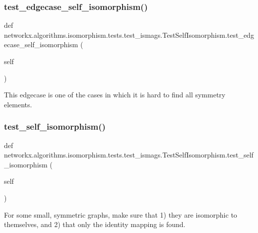 \subsubsection{\texorpdfstring{test\+\_\+edgecase\+\_\+self\+\_\+isomorphism()}{test\_edgecase\_self\_isomorphism()}}
{\footnotesize\ttfamily def networkx.\+algorithms.\+isomorphism.\+tests.\+test\+\_\+ismags.\+Test\+Self\+Isomorphism.\+test\+\_\+edgecase\+\_\+self\+\_\+isomorphism (\begin{DoxyParamCaption}\item[{}]{self }\end{DoxyParamCaption})}

\begin{DoxyVerb}This edgecase is one of the cases in which it is hard to find all
symmetry elements.
\end{DoxyVerb}
 \mbox{\label{classnetworkx_1_1algorithms_1_1isomorphism_1_1tests_1_1test__ismags_1_1TestSelfIsomorphism_a4659be802495814b06ff4e5878fe548a}} 
\subsubsection{\texorpdfstring{test\+\_\+self\+\_\+isomorphism()}{test\_self\_isomorphism()}}
{\footnotesize\ttfamily def networkx.\+algorithms.\+isomorphism.\+tests.\+test\+\_\+ismags.\+Test\+Self\+Isomorphism.\+test\+\_\+self\+\_\+isomorphism (\begin{DoxyParamCaption}\item[{}]{self }\end{DoxyParamCaption})}

\begin{DoxyVerb}For some small, symmetric graphs, make sure that 1) they are isomorphic
to themselves, and 2) that only the identity mapping is found.
\end{DoxyVerb}
 


